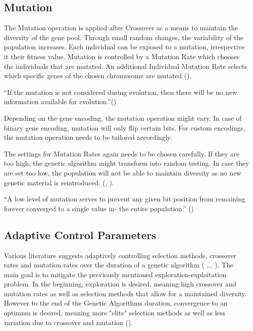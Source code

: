 \subsection{Mutation}
The Mutation operation is applied after Crossover as a means to maintain the diversity of the gene pool. Through small random changes, the variability of the population increases. Each individual can be exposed to a mutation, irrespective it their fitness value.
Mutation is controlled by a Mutation Rate which chooses the individuals that are mutated. An additional Individual Mutation Rate selects which specific genes of the chosen chromosome are mutated (\cite{srinivas_genetic_1994}).

\enquote{If the mutation is not considered during evolution, then there will be no new information available for evolution.}(\cite{katoch_review_2021})

Depending on the gene encoding, the mutation operation might vary. In case of binary gene encoding, mutation will only flip certain bits. For custom encodings, the mutation operation needs to be tailored accordingly.

The settings for Mutation Rates again needs to be chosen carefully. If they are too high, the genetic algorithm might transform into random testing. In case they are set too low, the population will not be able to maintain diversity as no new genetic material is reintroduced. (\cite{klampfl_using_nodate}, \cite{grefenstette_optimization_1986}).

\enquote{A low level of mutation serves to prevent any given bit position from remaining forever converged to a single value in- the entire population.} (\cite{grefenstette_optimization_1986})

\subsection{Adaptive Control Parameters}
Various literature suggests adaptively controlling selection methods, crossover rates and mutation rates over the duration of a genetic algorithm ( ... ). The main goal is to mitigate the previously mentioned exploration-exploitation problem. In the beginning, exploration is desired, meaning high crossover and mutation rates as well as selection methods that allow for a maintained diversity. However to the end of the Genetic Algorithms duration, convergence to an optimum is desired, meaning more "elite" selection methods as well as less variation due to crossover and mutation (\cite{srinivas_genetic_1994}).

